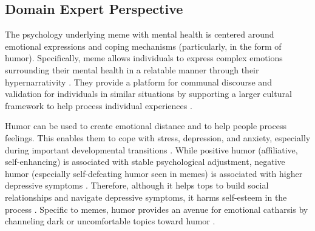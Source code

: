 \documentclass[letterpaper]{article} %
\begin{document}
\subsection{Domain Expert Perspective}
\label{sec:domain}



The psychology underlying meme with mental health is centered around emotional expressions and coping mechanisms (particularly, in the form of humor). Specifically, meme allows individuals to express complex emotions surrounding their mental health in a relatable manner through their hypernarrativity \citep{wagener2021postdigital}. They provide a platform for communal discourse and validation for individuals in similar situations by supporting a larger cultural framework to help process individual experiences \citep{wagener2021postdigital}.

Humor can be used to create emotional distance and to help people process feelings. This enables them to cope with stress, depression, and anxiety, especially during important developmental transitions \citep{sarink2023humor,erickson2006adolescent}. While positive humor (affiliative, self-enhancing) is associated with stable psychological adjustment, negative humor (especially self-defeating humor seen in memes) is associated with higher depressive symptoms \citep{erickson2006adolescent}. Therefore, although it helps tops to build social relationships and navigate depressive symptoms, it harms self-esteem in the process \citep{erickson2006adolescent}. Specific to memes, humor provides an avenue for emotional catharsis by channeling dark or uncomfortable topics toward humor \citep{sarink2023humor}. 



\end{document}
